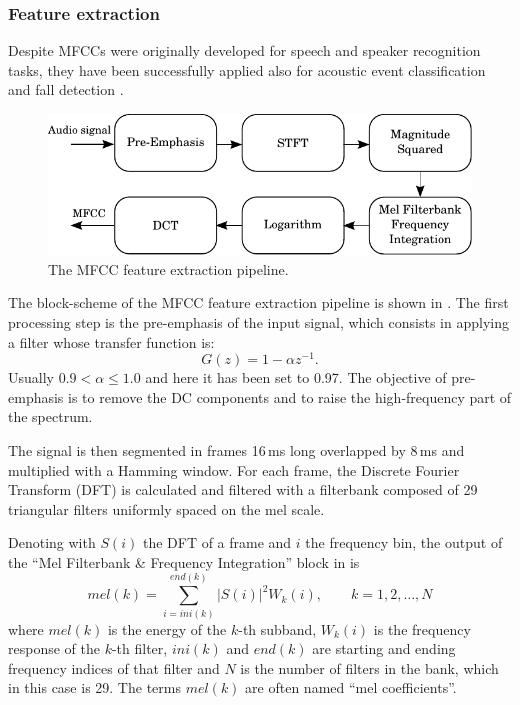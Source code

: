 \subsubsection{Feature extraction}\label{ssec:fx}
Despite MFCCs were originally developed for speech and speaker recognition tasks, they have been successfully applied also for acoustic event classification \cite{Temko2009} and fall detection \cite{zigel2009method}.

\begin{figure}[b]
	\centering
	\includegraphics[width=0.75\columnwidth]{img/mfcc_bn.pdf}
	\caption{The MFCC feature extraction pipeline.} \label{fig:mfcc}
\end{figure}

The block-scheme of the MFCC feature extraction pipeline is shown in . The first processing step is the pre-emphasis of the input signal, which consists in applying a filter whose transfer function is:
\begin{equation}
G(z) = 1 - \alpha z^{-1}.
\end{equation}
Usually $0.9<\alpha\leq1.0$ and here it has been set to 0.97. The objective of pre-emphasis is to remove the DC components and to raise the high-frequency part of the spectrum.

The signal is then segmented in frames 16\,ms long overlapped by 8\,ms and multiplied with a Hamming window. For each frame, the Discrete Fourier Transform (DFT) is calculated and filtered with a filterbank composed of 29 triangular filters uniformly spaced on the mel scale. 

Denoting with $S(i)$ the DFT of a frame and $i$ the frequency bin, the output of the ``Mel Filterbank \& Frequency Integration'' block in  is
\begin{equation}
mel(k) = \sum_{i=ini(k)}^{end(k)}|S(i)|^2 W_k(i), \qquad k=1,2,\ldots,N
\end{equation}
where $mel(k)$ is the energy of the $k$-th subband, $W_k(i)$ is the frequency response of the $k$-th filter, $ini(k)$ and $end(k)$ are starting and ending frequency indices of that filter and $N$ is the number of filters in the bank, which in this case is 29. The terms $mel(k)$ are often named ``mel coefficients''.

